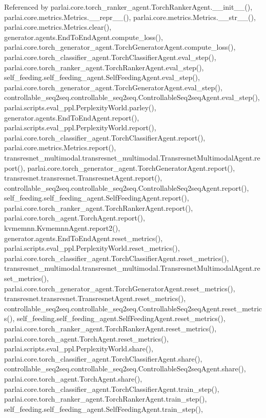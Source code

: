 Referenced by parlai.\+core.\+torch\+\_\+ranker\+\_\+agent.\+Torch\+Ranker\+Agent.\+\_\+\+\_\+init\+\_\+\+\_\+(), parlai.\+core.\+metrics.\+Metrics.\+\_\+\+\_\+repr\+\_\+\+\_\+(), parlai.\+core.\+metrics.\+Metrics.\+\_\+\+\_\+str\+\_\+\+\_\+(), parlai.\+core.\+metrics.\+Metrics.\+clear(), generator.\+agents.\+End\+To\+End\+Agent.\+compute\+\_\+loss(), parlai.\+core.\+torch\+\_\+generator\+\_\+agent.\+Torch\+Generator\+Agent.\+compute\+\_\+loss(), parlai.\+core.\+torch\+\_\+classifier\+\_\+agent.\+Torch\+Classifier\+Agent.\+eval\+\_\+step(), parlai.\+core.\+torch\+\_\+ranker\+\_\+agent.\+Torch\+Ranker\+Agent.\+eval\+\_\+step(), self\+\_\+feeding.\+self\+\_\+feeding\+\_\+agent.\+Self\+Feeding\+Agent.\+eval\+\_\+step(), parlai.\+core.\+torch\+\_\+generator\+\_\+agent.\+Torch\+Generator\+Agent.\+eval\+\_\+step(), controllable\+\_\+seq2seq.\+controllable\+\_\+seq2seq.\+Controllable\+Seq2seq\+Agent.\+eval\+\_\+step(), parlai.\+scripts.\+eval\+\_\+ppl.\+Perplexity\+World.\+parley(), generator.\+agents.\+End\+To\+End\+Agent.\+report(), parlai.\+scripts.\+eval\+\_\+ppl.\+Perplexity\+World.\+report(), parlai.\+core.\+torch\+\_\+classifier\+\_\+agent.\+Torch\+Classifier\+Agent.\+report(), parlai.\+core.\+metrics.\+Metrics.\+report(), transresnet\+\_\+multimodal.\+transresnet\+\_\+multimodal.\+Transresnet\+Multimodal\+Agent.\+report(), parlai.\+core.\+torch\+\_\+generator\+\_\+agent.\+Torch\+Generator\+Agent.\+report(), transresnet.\+transresnet.\+Transresnet\+Agent.\+report(), controllable\+\_\+seq2seq.\+controllable\+\_\+seq2seq.\+Controllable\+Seq2seq\+Agent.\+report(), self\+\_\+feeding.\+self\+\_\+feeding\+\_\+agent.\+Self\+Feeding\+Agent.\+report(), parlai.\+core.\+torch\+\_\+ranker\+\_\+agent.\+Torch\+Ranker\+Agent.\+report(), parlai.\+core.\+torch\+\_\+agent.\+Torch\+Agent.\+report(), kvmemnn.\+Kvmemnn\+Agent.\+report2(), generator.\+agents.\+End\+To\+End\+Agent.\+reset\+\_\+metrics(), parlai.\+scripts.\+eval\+\_\+ppl.\+Perplexity\+World.\+reset\+\_\+metrics(), parlai.\+core.\+torch\+\_\+classifier\+\_\+agent.\+Torch\+Classifier\+Agent.\+reset\+\_\+metrics(), transresnet\+\_\+multimodal.\+transresnet\+\_\+multimodal.\+Transresnet\+Multimodal\+Agent.\+reset\+\_\+metrics(), parlai.\+core.\+torch\+\_\+generator\+\_\+agent.\+Torch\+Generator\+Agent.\+reset\+\_\+metrics(), transresnet.\+transresnet.\+Transresnet\+Agent.\+reset\+\_\+metrics(), controllable\+\_\+seq2seq.\+controllable\+\_\+seq2seq.\+Controllable\+Seq2seq\+Agent.\+reset\+\_\+metrics(), self\+\_\+feeding.\+self\+\_\+feeding\+\_\+agent.\+Self\+Feeding\+Agent.\+reset\+\_\+metrics(), parlai.\+core.\+torch\+\_\+ranker\+\_\+agent.\+Torch\+Ranker\+Agent.\+reset\+\_\+metrics(), parlai.\+core.\+torch\+\_\+agent.\+Torch\+Agent.\+reset\+\_\+metrics(), parlai.\+scripts.\+eval\+\_\+ppl.\+Perplexity\+World.\+share(), parlai.\+core.\+torch\+\_\+classifier\+\_\+agent.\+Torch\+Classifier\+Agent.\+share(), controllable\+\_\+seq2seq.\+controllable\+\_\+seq2seq.\+Controllable\+Seq2seq\+Agent.\+share(), parlai.\+core.\+torch\+\_\+agent.\+Torch\+Agent.\+share(), parlai.\+core.\+torch\+\_\+classifier\+\_\+agent.\+Torch\+Classifier\+Agent.\+train\+\_\+step(), parlai.\+core.\+torch\+\_\+ranker\+\_\+agent.\+Torch\+Ranker\+Agent.\+train\+\_\+step(), self\+\_\+feeding.\+self\+\_\+feeding\+\_\+agent.\+Self\+Feeding\+Agent.\+train\+\_\+step(), 